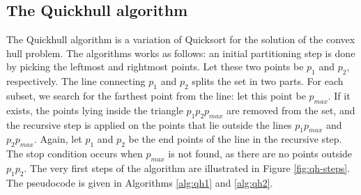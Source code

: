 \documentclass[]{finalproject}
\begin{document}
\subsection{The Quickhull algorithm}
The Quickhull algorithm is a variation of Quicksort for the solution of the convex hull problem.
The algorithms works as follows:
an initial partitioning step is done by picking the leftmost and rightmost points.
Let these two points be $p_1$ and $p_2$, respectively.
The line connecting $p_1$ and $p_2$ splits the set in two parts.
For each subset, we search for the farthest point from the line: let this point be $p_{max}$.
If it exists, the points lying inside the triangle $p_1p_2p_{max}$ are removed from the set,
and the recursive step is applied on the points that lie outside the lines $p_1p_{max}$ and $p_2p_{max}$.
Again, let $p_1$ and $p_2$ be the end points of the line in the recursive step.
The stop condition occurs when $p_{max}$ is not found, as there are no points outside $p_1p_2$.
The very first steps of the algorithm are illustrated in Figure \ref{fig:qh-steps}.
The pseudocode is given in Algorithms \ref{alg:qh1} and \ref{alg:qh2}.
\end{document}
